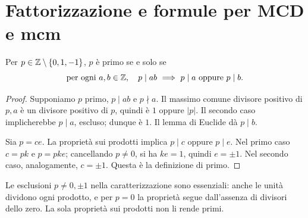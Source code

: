 \section{Fattorizzazione e formule per MCD e mcm}
\begin{proposizione}\label{prop:primo-prodotto}
Per $p\in\mathbb{Z}\setminus\{0,1,-1\}$, $p$ è primo se e solo se
\[
\text{per ogni }a,b\in\mathbb{Z},\quad p\mid ab\ \Longrightarrow\ p\mid a\ \text{oppure}\ p\mid b.
\]
\end{proposizione}
\begin{proof}
\passomath{\Rightarrow} Supponiamo $p$ primo, $p\mid ab$ e $p\nmid a$. Il massimo comune divisore positivo di $p,a$ è un divisore positivo di $p$, quindi è $1$ oppure $|p|$. Il secondo caso implicherebbe $p\mid a$, escluso; dunque è $1$. Il lemma di Euclide dà $p\mid b$.

\passomath{\Leftarrow} Sia $p=ce$. La proprietà sui prodotti implica $p\mid c$ oppure $p\mid e$. Nel primo caso $c=pk$ e $p=pke$; cancellando $p\ne0$, si ha $ke=1$, quindi $e=\pm1$. Nel secondo caso, analogamente, $c=\pm1$. Questa è la definizione di primo.
\end{proof}

\begin{osservazione}
Le esclusioni $p\ne0,\pm1$ nella caratterizzazione sono essenziali: anche le unità dividono ogni prodotto, e per $p=0$ la proprietà segue dall'assenza di divisori dello zero. La sola proprietà sui prodotti non li rende primi.
\end{osservazione}

